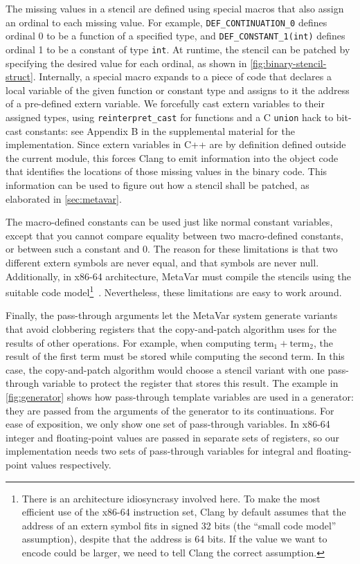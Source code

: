 \documentclass[acmsmall,nonacm,screen]{acmart}\settopmatter{printfolios=true,printccs=true,printacmref=false}
\newcommand{\figref}[1]{\autoref{#1}}
\newcommand{\secref}[1]{\autoref{#1}}
\newcommand{\appendixPlaceholderImpl}{Appendix B}
\newcommand\code[1]{\lstinline[mathescape=true,basicstyle=\ttfamily\normalsize]|#1|}
\newcommand{\cp}{copy-and-patch}
\begin{document}
The missing values in a stencil are defined using special macros that also assign an ordinal to each missing value. For example, \code{DEF_CONTINUATION_0} defines ordinal 0 to be a function of a specified type, and \code{DEF_CONSTANT_1(int)} defines ordinal 1 to be a constant of type \code{int}. At runtime, the stencil can be patched by specifying the desired value for each ordinal, as shown in \figref{fig:binary-stencil-struct}. Internally, a special macro expands to a piece of code that declares a local variable of the given function or constant type and assigns to it the address of a pre-defined extern variable. We forcefully cast extern variables to their assigned types, using {\tt reinterpret\_cast} for functions and a C {\tt union} hack to bit-cast constants: see \appendixPlaceholderImpl{} in the supplemental material for the implementation. Since extern variables in C++ are by definition defined outside the current module, this forces Clang to emit information into the object code that identifies the locations of those missing values in the binary code. This information can be used to figure out how a stencil shall be patched, as elaborated in \secref{sec:metavar}.


The macro-defined constants can be used just like normal constant variables, except that you cannot compare equality between two macro-defined constants, or between such a constant and 0. The reason for these limitations is that two different extern symbols are never equal, and that symbols are never null. Additionally, in x86-64 architecture, MetaVar must compile the stencils using the suitable code model\footnote{There is an architecture idiosyncrasy involved here. To make the most efficient use of the x86-64 instruction set, Clang by default assumes that the address of an extern symbol fits in signed 32 bits (the ``small code model'' assumption), despite that the address is 64 bits. If the value we want to encode could be larger, we need to tell Clang the correct assumption.}~\cite{systemvABI}. Nevertheless, these limitations are easy to work around.

Finally, the pass-through arguments let the MetaVar system generate variants that avoid clobbering registers that the \cp{} algorithm uses for the results of other operations. For example, when computing $\text{term}_1 + \text{term}_2$, the result of the first term must be stored while computing the second term. In this case, the \cp{} algorithm would choose a stencil variant with one pass-through variable to protect the register that stores this result. The example in \figref{fig:generator} shows how pass-through template variables are used in a generator: they are passed from the arguments of the generator to its continuations. For ease of exposition, we only show one set of pass-through variables. In x86-64 integer and floating-point values are passed in separate sets of registers, so our implementation needs two sets of pass-through variables for integral and floating-point values respectively.
\end{document}
